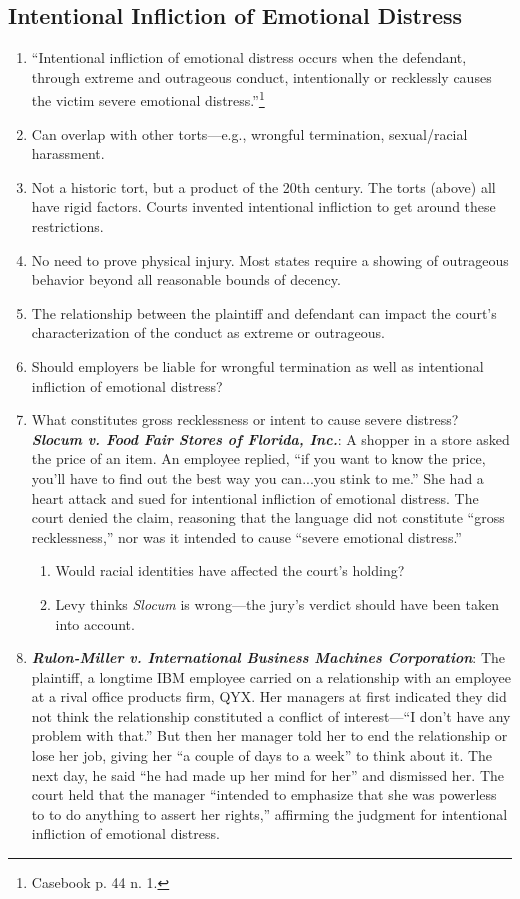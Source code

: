 \subsection{Intentional Infliction of Emotional Distress}

\begin{enumerate}
    \item ``Intentional infliction of emotional distress occurs when the defendant, through extreme and outrageous conduct, intentionally or recklessly causes the victim severe emotional distress.''\footnote{Casebook p. 44 n. 1.}
    \item Can overlap with other torts---e.g., wrongful termination, sexual/racial harassment.
    \item Not a historic tort, but a product of the 20th century. The torts (above) all have rigid factors. Courts invented intentional infliction to get around these restrictions.
    \item No need to prove physical injury. Most states require a showing of outrageous behavior beyond all reasonable bounds of decency.
    \item The relationship between the plaintiff and defendant can impact the court's characterization of the conduct as extreme or outrageous.
    \item Should employers be liable for wrongful termination as well as intentional infliction of emotional distress?
    \item What constitutes gross recklessness or intent to cause severe distress? \textbf{\emph{Slocum v. Food Fair Stores of Florida, Inc.}}: A shopper in a store asked the price of an item. An employee replied, ``if you want to know the price, you'll have to find out the best way you can...you stink to me.'' She had a heart attack and sued for intentional infliction of emotional distress. The court denied the claim, reasoning that the language did not constitute ``gross recklessness,'' nor was it intended to cause ``severe emotional distress.''
    \begin{enumerate}
        \item Would racial identities have affected the court's holding?
        \item Levy thinks \emph{Slocum} is wrong---the jury's verdict should have been taken into account.
    \end{enumerate}
    \item \textbf{\emph{Rulon-Miller v. International Business Machines Corporation}}: The plaintiff, a longtime IBM employee carried on a relationship with an employee at a rival office products firm, QYX. Her managers at first indicated they did not think the relationship constituted a conflict of interest---``I don't have any problem with that.'' But then her manager told her to end the relationship or lose her job, giving her ``a couple of days to a week'' to think about it. The next day, he said ``he had made up her mind for her'' and dismissed her. The court held that the manager ``intended to emphasize that she was powerless to to do anything to assert her rights,'' affirming the judgment for intentional infliction of emotional distress.

\end{enumerate}
